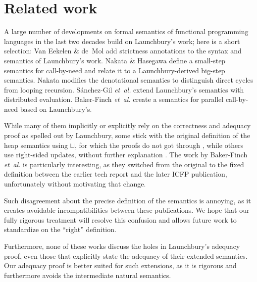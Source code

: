\documentclass{jfp1}
\theoremstyle{nonumberbreak}
\begin{document}
\section{Related work}

A large number of developments on formal semantics of functional programming languages in the last two decades build on Launchbury’s work; here is a short selection:
Van Eekelen \& de~Mol  add strictness annotations to the syntax and semantics of Launchbury’s work.
Nakata \& Hasegawa  define a small-step semantics for call-by-need and relate it to a Launchbury-derived big-step semantics. Nakata  modifies the denotational semantics to distinguish direct cycles from looping recursion.
S{\'a}nchez-Gil {\em et~al.}  extend Launchbury's semantics with distributed evaluation.
Baker-Finch {\em et~al.}  create a semantics for parallel call-by-need based on Launchbury’s.

While many of them implicitly or explicitly rely on the correctness and adequacy proof as spelled out by Launchbury, some stick with the original definition of the heap semantics using $\sqcup$, for which the proofs do not got through \cite{mixed,nakata, distributed, parallel-tr}, while others use right-sided updates, without further explanation \cite{nakata_blackhole, parallel}. The work by Baker-Finch {\em et~al.} is particularly interesting, as they switched from the original to the fixed definition between the earlier tech report and the later ICFP publication, unfortunately without motivating that change. %

Such disagreement about the precise definition of the semantics is annoying, as it creates avoidable incompatibilities between these publications. We hope that our fully rigorous treatment will resolve this confusion and allows future work to standardize on the ``right'' definition.

Furthermore, none of these works discuss the holes in Launchbury’s adequacy proof, even those that explicitly state the adequacy of their extended semantics. Our adequacy proof is better suited for such extensions, as it is rigorous and furthermore avoids the intermediate natural semantics.
\end{document}
